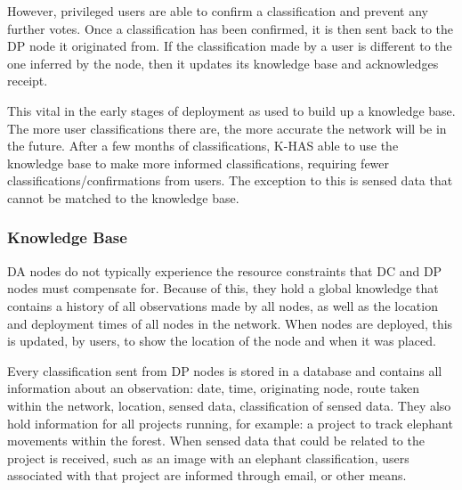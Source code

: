 	However, privileged users are able to confirm a classification and prevent any further votes. Once a classification has been confirmed, it is then sent back to the DP node it originated from. If the classification made by a user is different to the one inferred by the node, then it updates its knowledge base and acknowledges receipt.

	This \DIFdelbegin {}\DIFdelend \DIFaddbegin {}\DIFaddend vital in the early stages of deployment as \DIFdelbegin {}\DIFdelend \DIFaddbegin {}\DIFaddend used to build up a knowledge base. The more user classifications there are, the more accurate the network will be in the future. After a few months of classifications, K-HAS \DIFdelbegin {}\DIFdelend \DIFaddbegin {}\DIFaddend able to use the knowledge base to make more informed classifications, requiring fewer classifications/confirmations from users. The exception to this is sensed data that cannot be matched to the knowledge base. 

	\DIFaddbegin {}

	\DIFaddend \subsubsection{Knowledge Base}
	DA nodes do not typically experience the resource constraints that DC and DP nodes must compensate for. Because of this, they hold a global knowledge that contains a history of all observations made by all nodes, as well as the location and deployment times of all nodes in the network. When nodes are deployed, this is updated, by users, to show the location of the node and when it was placed. 

	Every classification sent from DP nodes is stored in a database and contains all information about an observation: date, time, originating node, route taken within the network, location, sensed data, classification of sensed data. They also hold information for all projects running, for example: a project to track elephant movements within the forest. When sensed data that could be related to the project is received, such as an image with an elephant classification, users associated with that project are informed through email, or other means.

